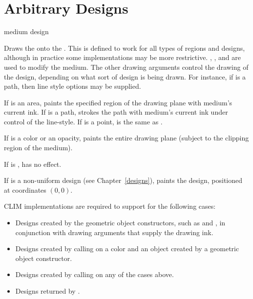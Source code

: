 \section {Arbitrary Designs}

 {medium design \key \DrawingOptions \LineJointCapOptions\ \TextOptions}

Draws the   onto the  .  This is
defined to work for all types of regions and designs, although in practice some
implementations may be more restrictive.  , , and
 are used to modify the medium.  The other drawing
arguments control the drawing of the design, depending on what sort of design is
being drawn.  For instance, if  is a path, then line style options
may be supplied.

If  is an area,  paints the specified region of the
drawing plane with medium's current ink.  If  is a
path,  strokes the path with medium's current ink under control
of the line-style.  If  is a point,  is the same as
.

If  is a color or an opacity,  paints the entire
drawing plane (subject to the clipping region of the medium).

If  is ,  has no effect.

If  is a non-uniform design (see Chapter~\ref{designs}),
 paints the design, positioned at coordinates $(0,0)$.

CLIM implementations are required to support  for the following
cases:

\begin{itemize}
\item Designs created by the geometric object constructors, such as
 and , in conjunction with drawing arguments that
supply the drawing ink.

\item Designs created by calling  on a color and an object
created by a geometric object constructor.

\item Designs created by calling  on any of the cases above.

\item Designs returned by .
\end{itemize}


